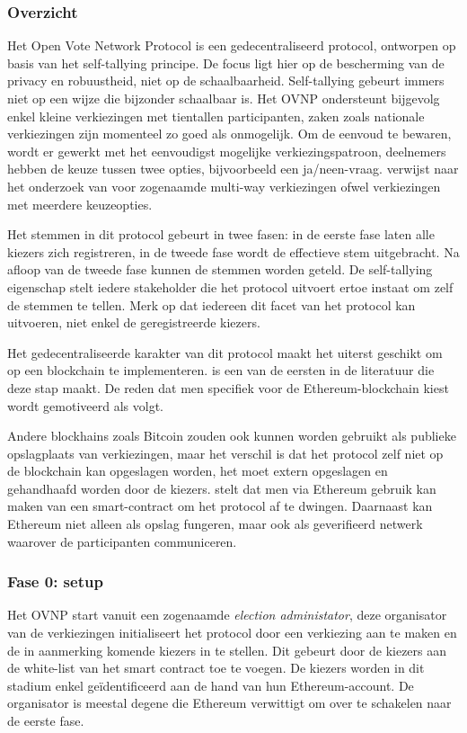		\subsubsection*{Overzicht }
			Het Open Vote Network Protocol is een gedecentraliseerd protocol, ontworpen op basis van het self-tallying principe. De focus ligt hier op de bescherming van de privacy en robuustheid, niet op de schaalbaarheid. Self-tallying gebeurt immers niet op een wijze die bijzonder schaalbaar is. Het  OVNP ondersteunt bijgevolg enkel kleine verkiezingen met tientallen participanten, zaken zoals nationale verkiezingen zijn momenteel  zo goed als onmogelijk. Om de eenvoud te bewaren, wordt er gewerkt met het eenvoudigst mogelijke verkiezingspatroon, deelnemers hebben de keuze tussen twee opties, bijvoorbeeld een ja/neen-vraag.  \textcite{McCorry2017} verwijst naar het onderzoek van \textcite{Hao2009} voor zogenaamde multi-way verkiezingen ofwel verkiezingen met meerdere keuzeopties. 
			
			Het stemmen in dit protocol gebeurt in twee fasen: in de eerste fase laten alle kiezers zich registreren, in de tweede fase wordt de effectieve stem uitgebracht. Na afloop van de tweede fase kunnen de stemmen worden geteld.  De self-tallying eigenschap stelt iedere stakeholder die het protocol uitvoert ertoe instaat om zelf de stemmen te tellen. Merk op dat iedereen dit facet van het protocol kan uitvoeren, niet enkel de geregistreerde kiezers.
			 
			Het gedecentraliseerde karakter van dit protocol maakt het uiterst geschikt om op een blockchain te implementeren. \textcite{McCorry2017} is een van de eersten in de literatuur die deze stap maakt. De reden dat men specifiek voor de Ethereum-blockchain kiest wordt gemotiveerd als volgt.
			
			Andere blockhains zoals Bitcoin zouden ook kunnen worden gebruikt als publieke opslagplaats van verkiezingen, maar het verschil is dat het protocol zelf niet op de blockchain kan opgeslagen worden, het moet extern opgeslagen en gehandhaafd worden door de kiezers. \textcite{McCorry2017} stelt dat men via Ethereum gebruik kan maken van een smart-contract om  het protocol af te dwingen. Daarnaast kan Ethereum niet alleen als opslag fungeren, maar ook als geverifieerd netwerk waarover de participanten communiceren.
		\subsubsection*{Fase 0: setup }
			Het OVNP start vanuit een zogenaamde \textit{election administator}, deze organisator van de verkiezingen initialiseert het protocol door een verkiezing aan te maken en de in aanmerking komende kiezers in te stellen. Dit gebeurt door de kiezers aan de white-list van het smart contract toe te voegen. De kiezers worden in dit stadium enkel geïdentificeerd aan de hand van hun Ethereum-account. De organisator is meestal degene die Ethereum verwittigt om over te schakelen naar de eerste fase.

